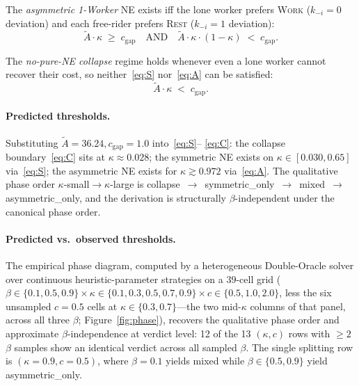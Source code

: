 \documentclass{anvil-paper}
\begin{document}
The \emph{asymmetric 1-Worker} NE exists iff the lone worker prefers
\textsc{Work} ($k_{-i}{=}0$ deviation) and each free-rider prefers
\textsc{Rest} ($k_{-i}{=}1$ deviation):
\begin{equation}
  \tilde A\cdot\kappa\;\geq\;c_{\text{gap}}
  \quad\text{AND}\quad
  \tilde A\cdot\kappa\cdot(1-\kappa)\;<\;c_{\text{gap}}.
  \tag{A}\label{eq:A}
\end{equation}

The \emph{no-pure-NE collapse} regime holds whenever even a lone worker
cannot recover their cost, so neither~\eqref{eq:S} nor~\eqref{eq:A} can be
satisfied:
\begin{equation}
  \tilde A\cdot\kappa\;<\;c_{\text{gap}}.
  \tag{C}\label{eq:C}
\end{equation}

\paragraph{Predicted thresholds.}
Substituting $\tilde A{=}36.24,c_{\text{gap}}{=}1.0$ into~\eqref{eq:S}--%
\eqref{eq:C}: the collapse boundary~\eqref{eq:C} sits at
$\kappa\approx 0.028$; the symmetric NE exists on
$\kappa\in[0.030,0.65]$ via~\eqref{eq:S}; the asymmetric NE exists for
$\kappa\gtrsim 0.972$ via~\eqref{eq:A}. The qualitative phase order
$\kappa$-small$\to$$\kappa$-large is
\textsf{collapse}~$\to$~\textsf{symmetric\_only}~$\to$~\textsf{mixed}~$\to$~%
\textsf{asymmetric\_only}, and the derivation is structurally
$\beta$-independent under the canonical phase order.

\paragraph{Predicted vs.\ observed thresholds.}
The empirical phase diagram, computed by a heterogeneous Double-Oracle
solver over continuous heuristic-parameter strategies on a $39$-cell grid
($\beta\in\{0.1,0.5,0.9\}\times\kappa\in\{0.1,0.3,0.5,0.7,0.9\}\times
c\in\{0.5,1.0,2.0\}$, less the six unsampled $c{=}0.5$ cells at
$\kappa\in\{0.3,0.7\}$---the two mid-$\kappa$ columns of that panel,
across all three $\beta$; Figure~\ref{fig:phase}), recovers the
qualitative phase order and approximate $\beta$-independence at verdict
level: 12 of the 13 $(\kappa,c)$ rows with $\geq 2$ $\beta$ samples
show an identical verdict across all sampled $\beta$. The single
splitting row is $(\kappa{=}0.9, c{=}0.5)$, where $\beta{=}0.1$
yields \textsf{mixed} while $\beta\in\{0.5, 0.9\}$ yield
\textsf{asymmetric\_only}.
\end{document}
